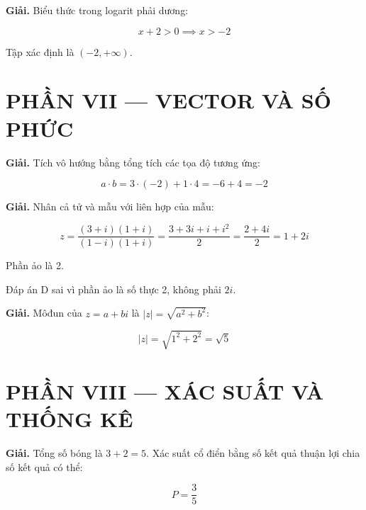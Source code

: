 \documentclass[11pt, a4paper]{article}
\begin{document}
\vspace{0.3cm}
\begin{dapan}[40 — Đáp án D]

\textbf{Giải.} Biểu thức trong logarit phải dương:

$$x + 2 > 0 \implies x > -2$$

Tập xác định là $(-2, +\infty)$.

\section{PHẦN VII — VECTOR VÀ SỐ PHỨC}


\end{dapan}
\vspace{0.3cm}
\begin{dapan}[41 — Đáp án B]

\textbf{Giải.} Tích vô hướng bằng tổng tích các tọa độ tương ứng:

$$a \cdot b = 3 \cdot (-2) + 1 \cdot 4 = -6 + 4 = -2$$


\end{dapan}
\vspace{0.3cm}
\begin{dapan}[42 — Đáp án C]

\textbf{Giải.} Nhân cả tử và mẫu với liên hợp của mẫu:

$$z = \dfrac{(3+i)(1+i)}{(1-i)(1+i)} = \dfrac{3 + 3i + i + i^2}{2} = \dfrac{2 + 4i}{2} = 1 + 2i$$

Phần ảo là 2.

 Đáp án D sai vì phần ảo là số thực 2, không phải $2i$.


\end{dapan}
\vspace{0.3cm}
\begin{dapan}[43 — Đáp án A]

\textbf{Giải.} Môđun của $z = a + bi$ là $\lvert z \rvert = \sqrt{a^2 + b^2}$:

$$\lvert z \rvert = \sqrt{1^2 + 2^2} = \sqrt{5}$$

\section{PHẦN VIII — XÁC SUẤT VÀ THỐNG KÊ}


\end{dapan}
\vspace{0.3cm}
\begin{dapan}[44 — Đáp án D]

\textbf{Giải.} Tổng số bóng là $3 + 2 = 5$. Xác suất cổ điển bằng số kết quả thuận lợi chia số kết quả có thể:

$$P = \dfrac{3}{5}$$


\end{dapan}
\end{document}
